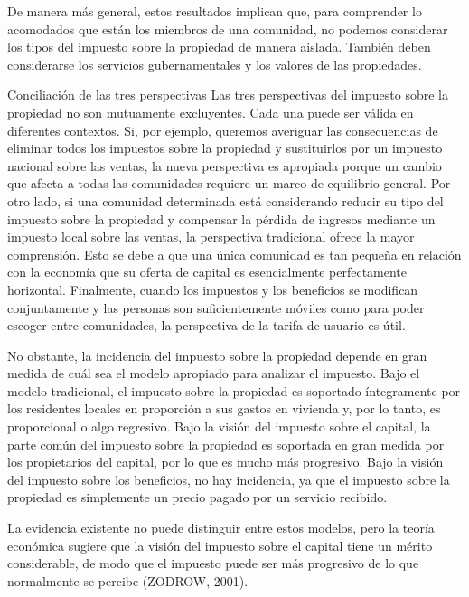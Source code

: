 \documentclass[10pt,a4paper]{article}
\begin{document}
De manera más general, estos resultados implican que, para comprender lo acomodados que están los miembros de una comunidad, no podemos considerar los tipos del impuesto sobre la propiedad de manera aislada. También deben considerarse los servicios gubernamentales y los valores de las propiedades.


Conciliación de las tres perspectivas 
Las tres perspectivas del impuesto sobre la propiedad no son mutuamente excluyentes. Cada una puede ser válida en diferentes contextos. Si, por ejemplo, queremos averiguar las consecuencias de eliminar todos los impuestos sobre la propiedad y sustituirlos por un impuesto nacional sobre las ventas, la nueva perspectiva es apropiada porque un cambio que afecta a todas las comunidades requiere un marco de equilibrio general. Por otro lado, si una comunidad determinada está considerando reducir su tipo del impuesto sobre la propiedad y compensar la pérdida de ingresos mediante un impuesto local sobre las ventas, la perspectiva tradicional ofrece la mayor comprensión. Esto se debe a que una única comunidad es tan pequeña en relación con la economía que su oferta de capital es esencialmente perfectamente horizontal. Finalmente, cuando los impuestos y los beneficios se modifican conjuntamente y las personas son suficientemente móviles como para poder escoger entre comunidades, la perspectiva de la tarifa de usuario es útil.

No obstante, la incidencia del impuesto sobre la propiedad depende en gran medida de cuál sea el modelo apropiado para analizar el impuesto. Bajo el modelo tradicional, el impuesto sobre la propiedad es soportado íntegramente por los residentes locales en proporción a sus gastos en vivienda y, por lo tanto, es proporcional o algo regresivo. Bajo la visión del impuesto sobre el capital, la parte común del impuesto sobre la propiedad es soportada en gran medida por los propietarios del capital, por lo que es mucho más progresivo. Bajo la visión del impuesto sobre los beneficios, no hay incidencia, ya que el impuesto sobre la propiedad es simplemente un precio pagado por un servicio recibido.

La evidencia existente no puede distinguir entre estos modelos, pero la teoría económica sugiere que la visión del impuesto sobre el capital tiene un mérito considerable, de modo que el impuesto puede ser más progresivo de lo que normalmente se percibe (ZODROW, 2001).
\end{document}
